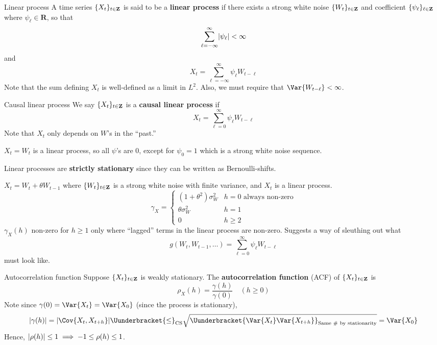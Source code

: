 \begin{Definition}{Linear process}{}
    A time series $ \{X_t\}_{t\in\mathbf{Z}} $ is said to be a
    \textbf{linear process} if there exists a strong
    white noise $ \{W_t\}_{t\in\mathbf{Z}} $ and coefficient
    $ \{\psi_\ell\}_{\ell\in\mathbf{Z}} $
    where $ \psi_\ell\in\mathbf{R} $, so that
    \[ \sum_{\ell=-\infty}^{\infty} \lvert\psi_\ell\rvert<\infty \]
    and
    \[ X_t=\sum_{\ell=-\infty}^{\infty} \psi_\ell W_{t-\ell} \]
    Note that the sum defining $ X_t $ is well-defined
    as a limit in $ L^2 $. Also, we
    must require that $ \Var{W_{t-\ell}}<\infty $.
\end{Definition}
\begin{Definition}{Causal linear process}{}
    We say $ \{X_t\}_{t\in\mathbf{Z}} $ is a \textbf{causal
        linear process} if
    \[ X_t=\sum_{\ell=0}^{\infty} \psi_\ell W_{t-\ell} \]
    Note that $ X_t $ only depends on $ W $'s in the ``past.''
\end{Definition}
\begin{Example}{}{}
    $ X_t=W_t $ is a linear process, so all
    $ \psi $'s are $ 0 $, except for $ \psi_0=1 $
    which is a strong white noise sequence.
\end{Example}
\begin{Remark}{}{}
    Linear processes are \textbf{strictly stationary} since they
    can be written as Bernoulli-shifts.
\end{Remark}
\begin{Example}{}{}
    $ X_t=W_t+\theta W_{t-1} $ where $ \{W_t\}_{t\in\mathbf{Z}} $ is a strong white noise
    with finite variance, and $ X_t $ is a linear process.
    \[ \gamma_X=\begin{cases}
            (1+\theta^2)\sigma_W^2 & h=0    \text{ always non-zero} \\
            \theta\sigma_W^2       & h=1                            \\
            0                      & h\ge 2
        \end{cases} \]
    $ \gamma_X(h) $ non-zero for $ h\ge 1 $
    only where ``lagged'' terms in the linear process
    are non-zero. Suggests a way of sleuthing out what
    \[ g(W_t,W_{t-1},\ldots)=\sum_{\ell=0}^{\infty} \psi_\ell W_{t-\ell} \]
    must look like.
\end{Example}
\begin{Definition}{Autocorrelation function}{}
    Suppose $ \{X_t\}_{t\in\mathbf{Z}} $ is weakly stationary. The
    \textbf{autocorrelation function} (ACF) of $ \{X_t\}_{t\in\mathbf{Z}} $
    is
    \[ \rho_X(h)=\frac{\gamma(h)}{\gamma(0)} \quad (h\ge 0) \]
    Note since $ \gamma(0)=\Var{X_t}=\Var{X_0} $ (since the process is stationary),
    \[ \abs{\gamma(h)}=\abs{\Cov{X_t,X_{t+h}}}\Uunderbracket{\le}_{\text{CS}}
        \sqrt{\Uunderbracket{\Var{X_t}\Var{X_{t+h}}}_{\text{Same \# by stationarity}}}=\Var{X_0} \]
    Hence, $ \lvert\rho(h)\rvert\le 1\implies -1\le \rho(h)\le 1 $.
\end{Definition}
